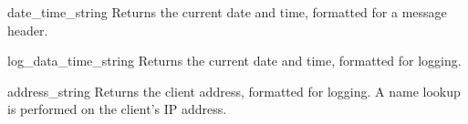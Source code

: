 \begin{methoddesc}{date_time_string}{}
Returns the current date and time, formatted for a message header.
\end{methoddesc}

\begin{methoddesc}{log_data_time_string}{}
Returns the current date and time, formatted for logging.
\end{methoddesc}

\begin{methoddesc}{address_string}{}
Returns the client address, formatted for logging. A name lookup
is performed on the client's IP address.
\end{methoddesc}


\begin{seealso}

\end{seealso}
